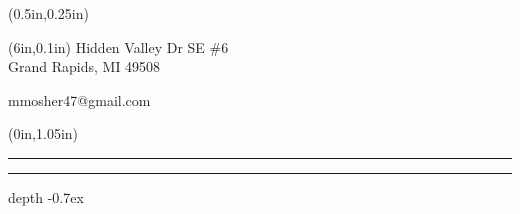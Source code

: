 \newcommand{\Address}{1431 Hidden Valley Dr SE \#6\\Grand Rapids, MI 49508}
\newcommand{\Email}{mmosher47@gmail.com}
\newcommand{\Phone}{616.965.1544}
\newcommand{\resline}[1]{%
   \begin{textblock*}{\paperwidth}(0in,{#1})
      \noindent{\rule[0.55ex]{0.5in}{0.4pt}}%
      \rule[1.5pt]{3.82in}{3pt}%
      {\leavevmode\leaders\hrule height 0.7ex depth \dimexpr0.4pt-0.7ex\hfill\kern0pt}
   \end{textblock*}
}

\begin{textblock*}{3.75in}(0.5in,0.25in)
\noindent\colorbox{black}{%
   \color{white}%
}
\color{black}
\end{textblock*}
\begin{textblock*}{2.25in}(6in,0.1in)
\flushright
\Address\par
\Email\par
\end{textblock*}
\resline{1.05in}

